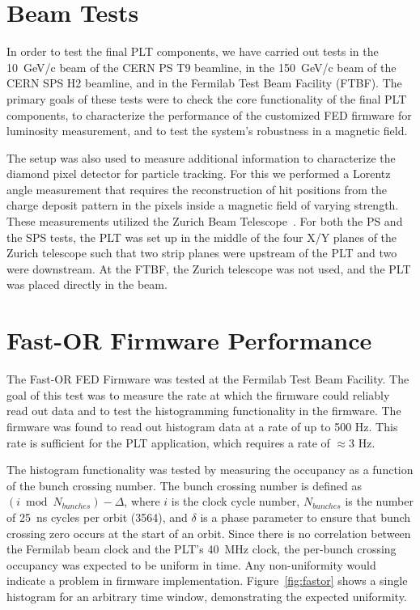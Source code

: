 \documentclass[journal]{IEEEtran}
\begin{document}
%
%
\section{Beam Tests}

 In order to test the final PLT components, we have carried out tests in the 10~GeV/c  beam of the CERN PS T9 beamline, in the 150~GeV/c beam of the CERN SPS H2 beamline, and in the Fermilab Test Beam Facility (FTBF).  The primary goals of these tests were to check the core functionality of the final PLT components, to characterize the performance of the customized FED firmware for luminosity measurement, and to test the system's robustness in a magnetic field. 
 
 The setup was also used to measure additional information to characterize the diamond pixel detector for particle tracking.  For this we performed a Lorentz angle measurement that requires the reconstruction of hit positions from the charge deposit pattern in the pixels inside a magnetic field of varying strength. These measurements utilized the Zurich Beam Telescope~\cite{zurich-telescope}.  For both the PS and the SPS tests, the PLT was set up in the middle of the four X/Y planes of the Zurich telescope such that two strip planes were upstream of the PLT and two were downstream.  At the FTBF, the Zurich telescope was not used, and the PLT was placed directly in the beam.
 

%
%
\section{Fast-OR Firmware Performance}
The Fast-OR FED Firmware was tested at the Fermilab Test Beam Facility.  The goal of this test was to measure the rate at which the firmware could reliably read out data and to test the histogramming functionality in the firmware.  The firmware was found to read out histogram data at a rate of up to 500 Hz.  This rate is sufficient for the PLT application, which requires a rate of $\approx 3$ Hz.   

The histogram functionality was tested by measuring the occupancy as a function of the bunch crossing number.  The bunch crossing number is defined as $(i \bmod N_{bunches}) - \Delta$, where $i$ is the clock cycle number, $N_{bunches}$ is the number of 25~ns cycles per orbit (3564), and $\delta$ is a phase parameter to ensure that bunch crossing zero occurs at the start of an orbit.  Since there is no correlation between the Fermilab beam clock and the PLT's 40~MHz clock, the per-bunch crossing occupancy was expected to be uniform in time.  Any non-uniformity would indicate a problem in firmware implementation.   Figure~\ref{fig:fastor} shows a single histogram for an arbitrary time window, demonstrating the expected uniformity.
\end{document}
